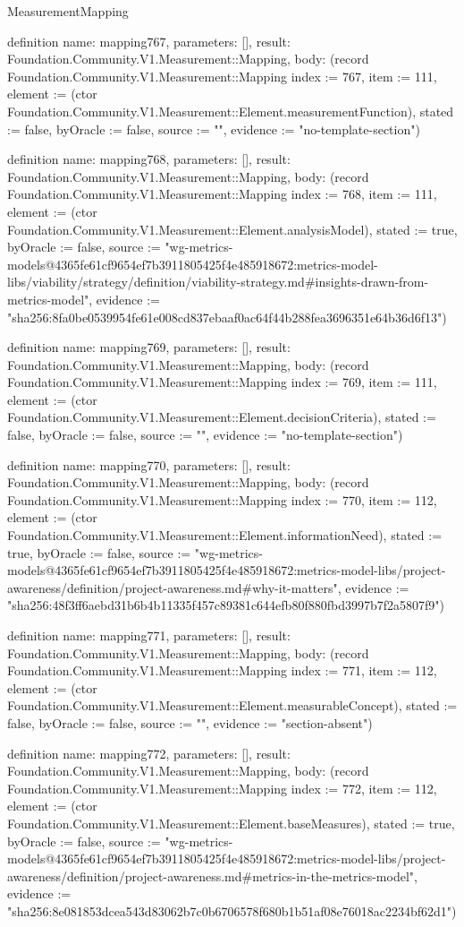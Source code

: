 \begin{lexlean}{MeasurementMapping}
\begin{semanticmodule}
definition{
  name: mapping767,
  parameters: [],
  result: Foundation.Community.V1.Measurement::Mapping,
  body: (record Foundation.Community.V1.Measurement::Mapping {index := 767, item := 111, element := (ctor Foundation.Community.V1.Measurement::Element.measurementFunction), stated := false, byOracle := false, source := "", evidence := "no-template-section"})
}

definition{
  name: mapping768,
  parameters: [],
  result: Foundation.Community.V1.Measurement::Mapping,
  body: (record Foundation.Community.V1.Measurement::Mapping {index := 768, item := 111, element := (ctor Foundation.Community.V1.Measurement::Element.analysisModel), stated := true, byOracle := false, source := "wg-metrics-models@4365fe61cf9654ef7b3911805425f4e485918672:metrics-model-libs/viability/strategy/definition/viability-strategy.md#insights-drawn-from-metrics-model", evidence := "sha256:8fa0be0539954fe61e008cd837ebaaf0ac64f44b288fea3696351e64b36d6f13"})
}

definition{
  name: mapping769,
  parameters: [],
  result: Foundation.Community.V1.Measurement::Mapping,
  body: (record Foundation.Community.V1.Measurement::Mapping {index := 769, item := 111, element := (ctor Foundation.Community.V1.Measurement::Element.decisionCriteria), stated := false, byOracle := false, source := "", evidence := "no-template-section"})
}

definition{
  name: mapping770,
  parameters: [],
  result: Foundation.Community.V1.Measurement::Mapping,
  body: (record Foundation.Community.V1.Measurement::Mapping {index := 770, item := 112, element := (ctor Foundation.Community.V1.Measurement::Element.informationNeed), stated := true, byOracle := false, source := "wg-metrics-models@4365fe61cf9654ef7b3911805425f4e485918672:metrics-model-libs/project-awareness/definition/project-awareness.md#why-it-matters", evidence := "sha256:48f3ff6aebd31b6b4b11335f457c89381c644efb80f880fbd3997b7f2a5807f9"})
}

definition{
  name: mapping771,
  parameters: [],
  result: Foundation.Community.V1.Measurement::Mapping,
  body: (record Foundation.Community.V1.Measurement::Mapping {index := 771, item := 112, element := (ctor Foundation.Community.V1.Measurement::Element.measurableConcept), stated := false, byOracle := false, source := "", evidence := "section-absent"})
}

definition{
  name: mapping772,
  parameters: [],
  result: Foundation.Community.V1.Measurement::Mapping,
  body: (record Foundation.Community.V1.Measurement::Mapping {index := 772, item := 112, element := (ctor Foundation.Community.V1.Measurement::Element.baseMeasures), stated := true, byOracle := false, source := "wg-metrics-models@4365fe61cf9654ef7b3911805425f4e485918672:metrics-model-libs/project-awareness/definition/project-awareness.md#metrics-in-the-metrics-model", evidence := "sha256:8e081853dcea543d83062b7c0b6706578f680b1b51af08e76018ac2234bf62d1"})
}


\end{semanticmodule}
\end{lexlean}
